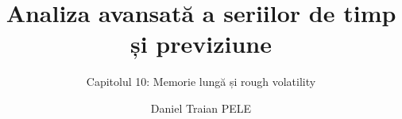 \newcommand{\refPS}{\href{https://doi.org/10.1214/009053604000000139}{Phillips și Shimotsu (2004)}}
\newcommand{\refQu}{\href{https://doi.org/10.1198/jbes.2010.09153}{Qu (2011)}}
\newcommand{\refRobA}{\href{https://doi.org/10.1214/aos/1176325382}{Robinson (1994)}}
\newcommand{\refRobB}{\href{https://doi.org/10.1214/aos/1176324636}{Robinson (1995a)}}
\newcommand{\refRobC}{\href{https://doi.org/10.1214/aos/1176324317}{Robinson (1995b)}}
\newcommand{\refSP}{\href{https://doi.org/10.1214/009053605000000309}{Shimotsu și Phillips (2005)}}
\newcommand{\refShi}{\href{https://doi.org/10.1017/S0266466609100075}{Shimotsu (2010)}}
\newcommand{\refVel}{\href{https://doi.org/10.1111/1467-9892.00127}{Velasco (1999)}}
\newcommand{\refWXY}{\href{https://doi.org/10.1016/j.jeconom.2021.08.001}{Wang, Xiao și Yu (2023)}}

\title[Analiza avansată a seriilor de timp și previziune]{Analiza avansată a seriilor de timp și previziune}
\subtitle{Capitolul 10: Memorie lungă și rough volatility}
\author[D.T. Pele]{Daniel Traian PELE}
\date{}

\providecommand{\atsapplink}[3]{\hypertarget{#2}{}\hyperlink{#1}{\beamergotobutton{#3}}}  %
\providecommand{\atsappback}[2]{\begin{tikzpicture}[remember picture,overlay]\node[anchor=south east] at ([xshift=-3mm,yshift=7mm]current page.south east){\hyperlink{#1}{\beamerreturnbutton{#2}}};\end{tikzpicture}}  %
\providecommand{\atschlink}[2]{\href{#1}{#2}}  %
\providecommand{\atschlinkt}[2]{\href{#1}{\usebeamercolor[fg]{frametitle}#2}}  %


